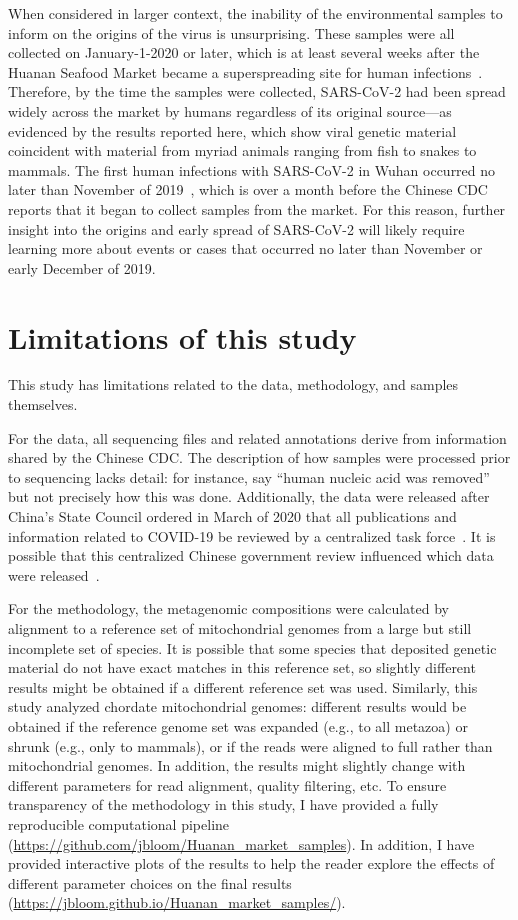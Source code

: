 \documentclass[9pt,twocolumn,twoside]{gsajnl_modified}
\begin{document}
When considered in larger context, the inability of the environmental samples to inform on the origins of the virus is unsurprising.
These samples were all collected on January-1-2020 or later, which is at least several weeks after the Huanan Seafood Market became a superspreading site for human infections~\citep{li2020early}.
Therefore, by the time the samples were collected, SARS-CoV-2 had been spread widely across the market by humans regardless of its original source---as evidenced by the results reported here, which show viral genetic material coincident with material from myriad animals ranging from fish to snakes to mammals. 
The first human infections with SARS-CoV-2 in Wuhan occurred no later than November of 2019~\citep{odni2022,zhang2020viral,van2020emergence,pipes2021assessing}, which is over a month before the Chinese CDC reports that it began to collect samples from the market.
For this reason, further insight into the origins and early spread of SARS-CoV-2 will likely require learning more about events or cases that occurred no later than November or early December of 2019. 


\section{Limitations of this study}
This study has limitations related to the data, methodology, and samples themselves.

For the data, all sequencing files and related annotations derive from information shared by the Chinese CDC.
The description of how samples were processed prior to sequencing lacks detail: for instance, \citet{liu2023surveillance} say ``human nucleic acid was removed'' but not precisely how this was done.
Additionally, the data were released after China's State Council ordered in March of 2020 that all publications and information related to COVID-19 be reviewed by a centralized task force~\citep{kang2020china}.
It is possible that this centralized Chinese government review influenced which data were released~\citep{hvistendahl2023}.

For the methodology, the metagenomic compositions were calculated by alignment to a reference set of mitochondrial genomes from a large but still incomplete set of species.
It is possible that some species that deposited genetic material do not have exact matches in this reference set, so slightly different results might be obtained if a different reference set was used.
Similarly, this study analyzed chordate mitochondrial genomes: different results would be obtained if the reference genome set was expanded (e.g., to all metazoa) or shrunk (e.g., only to mammals), or if the reads were aligned to full rather than mitochondrial genomes.
In addition, the results might slightly change with different parameters for read alignment, quality filtering, etc.
To ensure transparency of the methodology in this study, I have provided a fully reproducible computational pipeline (\url{https://github.com/jbloom/Huanan_market_samples}).
In addition, I have provided interactive plots of the results to help the reader explore the effects of different parameter choices on the final results (\url{https://jbloom.github.io/Huanan_market_samples/}).
\end{document}
